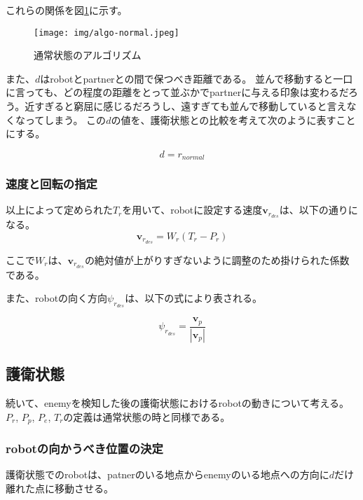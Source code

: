 \documentclass{kuisthesis}
\begin{document}
これらの関係を図\ref{fig:algo-normal}に示す。

\begin{figure}[h]\begin{center}
	\texttt{[image: img/algo-normal.jpeg]}
	\caption{通常状態のアルゴリズム}
	\label{fig:algo-normal}
\end{center}\end{figure}

また、$d$はrobotとpartnerとの間で保つべき距離である。
並んで移動すると一口に言っても、どの程度の距離をとって並ぶかでpartnerに与える印象は変わるだろう。近すぎると窮屈に感じるだろうし、遠すぎても並んで移動していると言えなくなってしまう。
この$d$の値を、護衛状態との比較を考えて次のように表すことにする。

\begin{equation}
d  = r_{normal} \nonumber
\end{equation}

\subsubsection*{速度と回転の指定}

以上によって定められた$T_r$を用いて、robotに設定する速度$\bm{v}_r_{des}$は、以下の通りになる。
\begin{equation}
	\bm{v}_r_{des} = W_r (T_r - P_r) \nonumber
\end{equation}

ここで$W_r$は、$\bm{v}_r_{des}$の絶対値が上がりすぎないように調整のため掛けられた係数である。

また、robotの向く方向$\psi_r_{des}$は、以下の式により表される。

\begin{equation}
	\psi_r_{des} = \frac{\bm{v}_p}{|\bm{v}_p|} \nonumber
\end{equation}


\subsection{護衛状態}

続いて、enemyを検知した後の護衛状態におけるrobotの動きについて考える。
$P_r$, $P_p$, $P_e$, $T_r$の定義は通常状態の時と同様である。

\subsubsection*{robotの向かうべき位置の決定}

護衛状態でのrobotは、patnerのいる地点からenemyのいる地点への方向に$d$だけ離れた点に移動させる。
\end{document}
